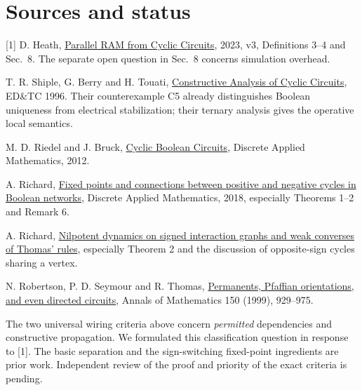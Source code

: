 \documentclass[11pt]{article}
\begin{document}
\section*{Sources and status}
[1] D. Heath, \href{https://arxiv.org/abs/2309.05133}{Parallel RAM from Cyclic Circuits}, 2023, v3, Definitions 3--4 and Sec.~8. The separate open question in Sec.~8 concerns simulation overhead.\par
[2] T. R. Shiple, G. Berry and H. Touati, \href{https://www.cecs.uci.edu/~papers/compendium94-03/papers/1996/edt96/pdffiles/07a_1.pdf}{Constructive Analysis of Cyclic Circuits}, ED\&TC 1996. Their counterexample C5 already distinguishes Boolean uniqueness from electrical stabilization; their ternary analysis gives the operative local semantics.\par
[3] M. D. Riedel and J. Bruck, \href{https://www.cctbio.ece.umn.edu/wiki/images/9/94/Riedel_Bruck_Cyclic_Boolean_Circuits.pdf}{Cyclic Boolean Circuits}, Discrete Applied Mathematics, 2012.\par
[4] A. Richard, \href{https://arxiv.org/abs/1509.07702}{Fixed points and connections between positive and negative cycles in Boolean networks}, Discrete Applied Mathematics, 2018, especially Theorems 1--2 and Remark 6.\par
[5] A. Richard, \href{https://arxiv.org/abs/2201.08596}{Nilpotent dynamics on signed interaction graphs and weak converses of Thomas' rules}, especially Theorem 2 and the discussion of opposite-sign cycles sharing a vertex.\par
[6] N. Robertson, P. D. Seymour and R. Thomas, \href{https://annals.math.princeton.edu/1999/150-3/p05}{Permanents, Pfaffian orientations, and even directed circuits}, Annals of Mathematics 150 (1999), 929--975.\par\medskip
The two universal wiring criteria above concern \emph{permitted} dependencies and constructive propagation. We formulated this classification question in response to [1]. The basic separation and the sign-switching fixed-point ingredients are prior work. Independent review of the proof and priority of the exact criteria is pending.
\end{document}
